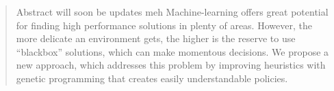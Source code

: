 \documentclass[pdftex,12pt,a4paper]{report}
\begin{document}
\deckblatt

\erklaerung

\begin{abstract}
Abstract will soon be updates meh
Machine-learning offers great potential for finding high performance solutions in plenty of areas.  However, the more delicate an environment gets, the higher is the reserve to use ``blackbox'' solutions, which can make momentous decisions. We propose a new approach, which addresses this problem by improving heuristics with genetic programming that creates easily understandable policies.

\end{abstract}

\tableofcontents


%
%
%
%

%
%
%
%
%


\listoffigures

\listoftables

\newpage
 
\end{document}
